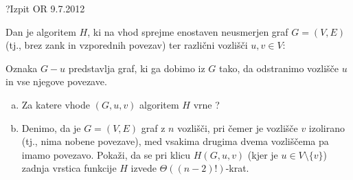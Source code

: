 \begin{naloga}{?}{Izpit OR 9.7.2012}
\begin{vprasanje}
Dan je algoritem $H$,
ki na vhod sprejme enostaven neusmerjen graf $G = (V, E)$
(tj., brez zank in vzporednih povezav)
ter različni vozlišči $u, v \in V$:
\begin{small}
\begin{algorithmic}
        \State \Return \True
    \EndIf
            \State \Return \True
        \EndIf
    \EndFor
    \State \Return \False
\EndFunction
\end{algorithmic}
\end{small}
Oznaka $G - u$ predstavlja graf,
ki ga dobimo iz $G$ tako, da odstranimo vozlišče $u$ in vse njegove povezave.

\begin{enumerate}[(a)]
\item Za katere vhode $(G, u, v)$ algoritem $H$ vrne \True?

\item Denimo, da je $G = (V, E)$ graf z $n$ vozlišči,
pri čemer je vozlišče $v$ izolirano (tj., nima nobene povezave),
med vsakima drugima dvema vozliščema pa imamo povezavo.
Pokaži, da se pri klicu $H(G, u, v)$ (kjer je $u \in V \setminus \{v\}$)
zadnja vrstica funkcije $H$ izvede $\Theta((n-2)!)$-krat.
\end{enumerate}
\end{vprasanje}
\begin{odgovor}
\end{odgovor}
\end{naloga}
